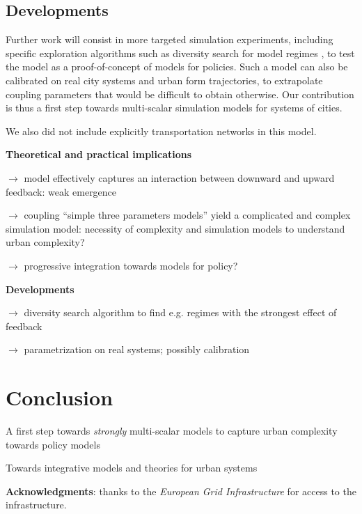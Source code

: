 \documentclass[11pt]{article}
\begin{document}
\subsection{Developments}

Further work will consist in more targeted simulation experiments, including specific exploration algorithms such as diversity search for model regimes \cite{reuillon2013openmole}, to test the model as a proof-of-concept of models for policies. Such a model can also be calibrated on real city systems and urban form trajectories, to extrapolate coupling parameters that would be difficult to obtain otherwise. Our contribution is thus a first step towards multi-scalar simulation models for systems of cities.

We also did not include explicitly transportation networks in this model.


\textbf{Theoretical and practical implications}



$\rightarrow$ model effectively captures an interaction between downward and upward feedback: weak emergence \cite{bedau2002downward}



$\rightarrow$ coupling ``simple three parameters models'' yield a complicated and complex simulation model: necessity of complexity and simulation models to understand urban complexity? 


$\rightarrow$ progressive integration towards models for policy?


\textbf{Developments}

$\rightarrow$ diversity search algorithm to find e.g. regimes with the strongest effect of feedback


$\rightarrow$ parametrization on real systems; possibly calibration

\cite{raimbault2019ilus}




\section{Conclusion}

A first step towards \textit{strongly} multi-scalar models to capture urban complexity towards policy models

 Towards integrative models and theories for urban systems \cite{raimbault2019methods}

\textbf{Acknowledgments}: thanks to the \textit{European Grid Infrastructure} for access to the infrastructure.






\end{document}
